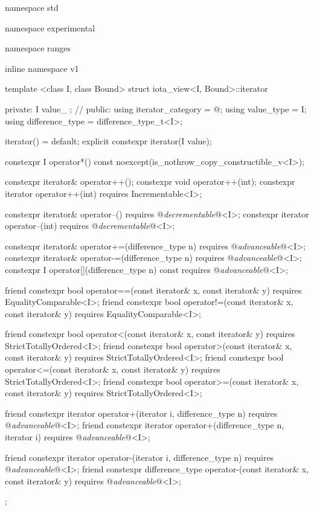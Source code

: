 \begin{codeblock}
namespace std { namespace experimental { namespace ranges { inline namespace v1 {
  template <class I, class Bound>
  struct iota_view<I, Bound>::iterator {
  private:
    I value_ {}; // \expos
  public:
    using iterator_category = @\seebelow@;
    using value_type = I;
    using difference_type = difference_type_t<I>;

    iterator() = default;
    explicit constexpr iterator(I value);

    constexpr I operator*() const noexcept(is_nothrow_copy_constructible_v<I>);

    constexpr iterator& operator++();
    constexpr void operator++(int);
    constexpr iterator operator++(int) requires Incrementable<I>;

    constexpr iterator& operator--() requires @\textit{decrementable}@<I>;
    constexpr iterator operator--(int) requires @\textit{decrementable}@<I>;

    constexpr iterator& operator+=(difference_type n)
      requires @\textit{advanceable}@<I>;
    constexpr iterator& operator-=(difference_type n)
      requires @\textit{advanceable}@<I>;
    constexpr I operator[](difference_type n) const
      requires @\textit{advanceable}@<I>;

    friend constexpr bool operator==(const iterator& x, const iterator& y)
      requires EqualityComparable<I>;
    friend constexpr bool operator!=(const iterator& x, const iterator& y)
      requires EqualityComparable<I>;

    friend constexpr bool operator<(const iterator& x, const iterator& y)
      requires StrictTotallyOrdered<I>;
    friend constexpr bool operator>(const iterator& x, const iterator& y)
      requires StrictTotallyOrdered<I>;
    friend constexpr bool operator<=(const iterator& x, const iterator& y)
      requires StrictTotallyOrdered<I>;
    friend constexpr bool operator>=(const iterator& x, const iterator& y)
      requires StrictTotallyOrdered<I>;

    friend constexpr iterator operator+(iterator i, difference_type n)
      requires @\textit{advanceable}@<I>;
    friend constexpr iterator operator+(difference_type n, iterator i)
      requires @\textit{advanceable}@<I>;

    friend constexpr iterator operator-(iterator i, difference_type n)
      requires @\textit{advanceable}@<I>;
    friend constexpr difference_type operator-(const iterator& x, const iterator& y)
      requires @\textit{advanceable}@<I>;
  };
}}}}
\end{codeblock}

